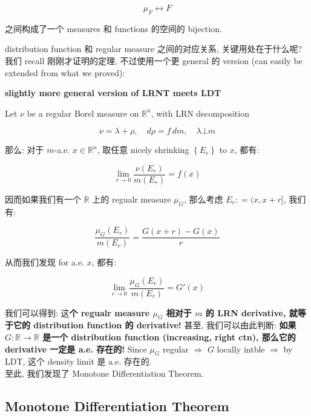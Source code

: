 \documentclass{qlnotes-export}
\begin{document}
\[\mu_{F}\operatorname{\leftrightarrow ︎}F\]

之间构成了一个 measures 和 functions 的空间的 bijection.

distribution function 和 regular measure 之间的对应关系, 关键用处在于什么呢? 我们 recall 刚刚才证明的定理, 不过使用一个更 general 的 version (can easily be extended from what we proved):

\begin{theorem}{\protect{}\label{kn-slightly-more-general-version-of-lrnt-meets-ldt}{\textbf{slightly
more general version of LRNT meets LDT}}}

Let \(\nu\) be a regular Borel measure on \({\mathbb{R}}^{n}\), with LRN decomposition

\[\nu = \lambda + \rho,\quad d\rho = f\, dm,\quad\lambda\bot m\]

那么: 对于 \(m\)-a.e. \(x \in {\mathbb{R}}^{n}\), 取任意 nicely shrinking \(\left\{ E_{r} \right\}\) to \(x\), 都有:

\[\lim\limits_{r\rightarrow 0}\frac{\nu(E_{r})}{m(E_{r})} = f(x)\]

\end{theorem}

因而如果我们有一个 \(\mathbb{R}\) 上的 regualr measure \(\mu_{G}\), 那么考虑 \(E_{r}: = (x,x + r\rbrack\), 我们有:

\[\frac{\mu_{G}(E_{r})}{m(E_{r})} = \frac{G(x + r) - G(x)}{r}\]

从而我们发现 for a.e. \(x\), 都有:

\[\lim\limits_{r\rightarrow 0}\frac{\mu_{G}(E_{r})}{m(E_{r})} = G'(x)\]

我们可以得到: 这\textbf{个 regualr measure \(\mu_{G}\) 相对于 \(m\) 的 LRN derivative, 就等于它的 distribution function 的 derivative!} 甚至, 我们可以由此判断: \textbf{如果 \(G:{\mathbb{R}}\rightarrow{\mathbb{R}}\) 是一个 distribution function (increasing, right ctn), 那么它的 derivative 一定是 a.e. 存在的!} Since \(\mu_{G}\) regular \(\Longrightarrow\) \(G\) locally intble \(\Longrightarrow\) by LDT, 这个 density limit 是 a.e. 存在的.\\
至此, 我们发现了 Monotone Differentiation Theorem.\\

\subsection{Monotone Differentiation Theorem}\label{monotone-differentiation-theorem}
\end{document}
